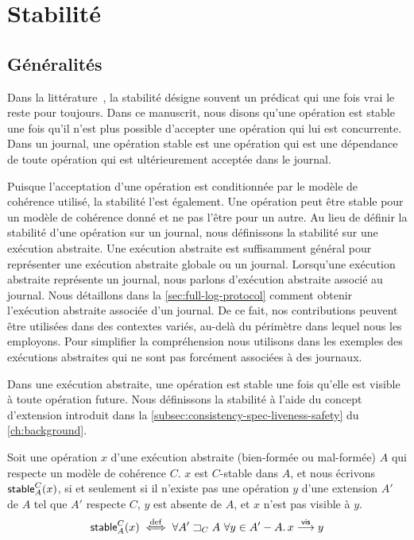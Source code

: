 \section{Stabilité}\label{sec:stability}

\subsection{Généralités}\label{subsec:general-stability}

Dans la littérature~\autocite{baquero_2018_pure-op-crdt, shapiro_2011_crdt,birman_1991_causalmulticast}, la stabilité désigne souvent un prédicat qui une fois vrai le reste pour toujours.
Dans ce manuscrit, nous disons qu'une opération est stable une fois qu'il n'est plus possible d'accepter une opération qui lui est concurrente.
Dans un journal, une opération stable est une opération qui est une dépendance de toute opération qui est ultérieurement acceptée dans le journal.

Puisque l'acceptation d'une opération est conditionnée par le modèle de cohérence utilisé, la stabilité l'est également.
Une opération peut être stable pour un modèle de cohérence donné et ne pas l'être pour un autre.
Au lieu de définir la stabilité d'une opération sur un journal, nous définissons la stabilité sur une exécution abstraite.
Une exécution abstraite est suffisamment général pour représenter une exécution abstraite globale ou un journal.
Lorsqu'une exécution abstraite représente un journal, nous parlons d'exécution abstraite associé au journal.
Nous détaillons dans la \autoref{sec:full-log-protocol} comment obtenir l'exécution abstraite associée d'un journal.
De ce fait, nos contributions peuvent être utilisées dans des contextes variés, au-delà du périmètre dans lequel nous les employons.
Pour simplifier la compréhension nous utilisons dans les exemples des exécutions abstraites qui ne sont pas forcément associées à des journaux.

Dans une exécution abstraite, une opération est stable une fois qu'elle est visible à toute opération future.
Nous définissons la stabilité à l'aide du concept d'extension introduit dans la \autoref{subsec:consistency-spec-liveness-safety} du \autoref{ch:background}.

\begin{definition}\label{def:stable}
Soit une opération $x$ d'une exécution abstraite (bien-formée ou mal-formée) $A$ qui respecte un modèle de cohérence $C$.
$x$ est $C$-stable dans $A$, et nous écrivons $\operatorname{\mathsf{stable}}_A^C(x)$, si et seulement si il n'existe pas une opération $y$ d'une extension $A'$ de $A$ tel que $A'$ respecte $C$, $y$ est absente de $A$, et $x$ n'est pas visible à $y$.
\begin{equation*}
  \operatorname{\mathsf{stable}}_A^C(x) \overset{\mathrm{def}}{\iff} \forall A' \sqsupset_C A\ \forall y \in A' - A \ldotp x \overset{\mathsf{vis}}{\longrightarrow} y
\end{equation*}
\end{definition}

